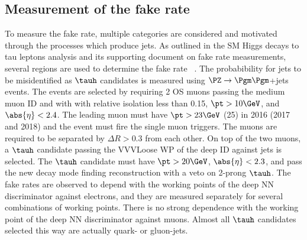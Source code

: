 %
%
%


\subsection{Measurement of the fake rate}
To measure the fake rate, multiple categories are considered and motivated through the processes which produce jets. As outlined in the SM Higgs decays to tau leptons analysis and its supporting document on fake rate measurements, several regions are used to determine the fake rate ~\cite{SMHTTarXiv}. 
The probabibility for jets to be misidentified as $\tauh$ candidates is measured using $\PZ\to\Pgm\Pgm$+jets events. 
The events are selected by requiring 2 OS muons passing the medium muon ID and with with relative isolation less than 
0.15, $\pt>10\GeV$, and $\abs{\eta}<2.4$. The leading muon must have $\pt>23\GeV$ (25\GeV) in 2016 (2017 and 2018) and 
the event must fire the single muon triggers. The muons are required to be separated 
by $\Delta R>0.3$ from each other. On top of the two muons, a $\tauh$ candidate passing the VVVLoose WP of 
the deep ID against jets is selected. The $\tauh$ candidate must have $\pt>20\GeV$, $\abs{\eta}<2.3$, and pass 
the new decay mode finding reconstruction with a veto on 2-prong $\tauh$. The fake rates are observed to depend with the working points of the deep NN discriminator against electrons, and they are measured separately for several combinations of working points. There is no strong dependence with the working point of the deep NN discriminator against muons. Almost all $\tauh$ candidates selected this way are actually quark- or 
gluon-jets.

